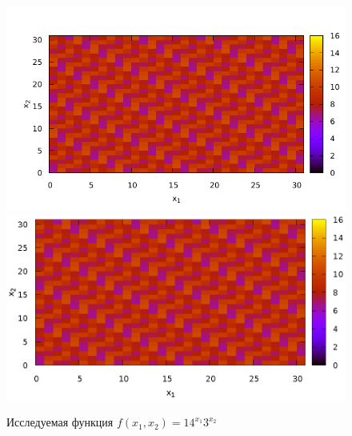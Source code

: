 \begin{figure}
\centering

\ifpdf
\includegraphics[angle=0]
{./part4/quantcomp/picdiscretlog0.pdf}
\else
\includegraphics[angle=0]
{./part4/quantcomp/picdiscretlog0.eps}
\fi
%

\caption{Исследуемая функция $f(x_1, x_2) = 14^{x_1}3^{x_2}$} 
\label{fig:part4:quantcomp:dl0}
\end{figure}
